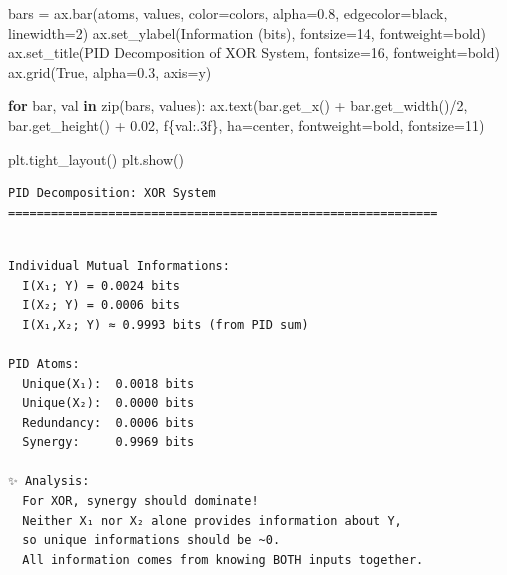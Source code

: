 \documentclass[
  11pt,
  letterpaper,
  oneside,
  openany]{book}
\newenvironment{Shaded}{\begin{snugshade}}{\end{snugshade}}
\newcommand{\BuiltInTok}[1]{\textcolor[rgb]{0.00,0.23,0.31}{#1}}
\newcommand{\ControlFlowTok}[1]{\textcolor[rgb]{0.00,0.23,0.31}{\textbf{#1}}}
\newcommand{\DecValTok}[1]{\textcolor[rgb]{0.68,0.00,0.00}{#1}}
\newcommand{\FloatTok}[1]{\textcolor[rgb]{0.68,0.00,0.00}{#1}}
\newcommand{\KeywordTok}[1]{\textcolor[rgb]{0.00,0.23,0.31}{\textbf{#1}}}
\newcommand{\NormalTok}[1]{\textcolor[rgb]{0.00,0.23,0.31}{#1}}
\newcommand{\OperatorTok}[1]{\textcolor[rgb]{0.37,0.37,0.37}{#1}}
\newcommand{\SpecialCharTok}[1]{\textcolor[rgb]{0.37,0.37,0.37}{#1}}
\newcommand{\SpecialStringTok}[1]{\textcolor[rgb]{0.13,0.47,0.30}{#1}}
\newcommand{\StringTok}[1]{\textcolor[rgb]{0.13,0.47,0.30}{#1}}
\newcommand{\VariableTok}[1]{\textcolor[rgb]{0.07,0.07,0.07}{#1}}
\begin{document}
\begin{Shaded}
\begin{Highlighting}[]
\NormalTok{bars }\OperatorTok{=}\NormalTok{ ax.bar(atoms, values, color}\OperatorTok{=}\NormalTok{colors, alpha}\OperatorTok{=}\FloatTok{0.8}\NormalTok{, edgecolor}\OperatorTok{=}\StringTok{\textquotesingle{}black\textquotesingle{}}\NormalTok{, linewidth}\OperatorTok{=}\DecValTok{2}\NormalTok{)}
\NormalTok{ax.set\_ylabel(}\StringTok{\textquotesingle{}Information (bits)\textquotesingle{}}\NormalTok{, fontsize}\OperatorTok{=}\DecValTok{14}\NormalTok{, fontweight}\OperatorTok{=}\StringTok{\textquotesingle{}bold\textquotesingle{}}\NormalTok{)}
\NormalTok{ax.set\_title(}\StringTok{\textquotesingle{}PID Decomposition of XOR System\textquotesingle{}}\NormalTok{, fontsize}\OperatorTok{=}\DecValTok{16}\NormalTok{, fontweight}\OperatorTok{=}\StringTok{\textquotesingle{}bold\textquotesingle{}}\NormalTok{)}
\NormalTok{ax.grid(}\VariableTok{True}\NormalTok{, alpha}\OperatorTok{=}\FloatTok{0.3}\NormalTok{, axis}\OperatorTok{=}\StringTok{\textquotesingle{}y\textquotesingle{}}\NormalTok{)}

\ControlFlowTok{for}\NormalTok{ bar, val }\KeywordTok{in} \BuiltInTok{zip}\NormalTok{(bars, values):}
\NormalTok{    ax.text(bar.get\_x() }\OperatorTok{+}\NormalTok{ bar.get\_width()}\OperatorTok{/}\DecValTok{2}\NormalTok{, bar.get\_height() }\OperatorTok{+} \FloatTok{0.02}\NormalTok{, }
            \SpecialStringTok{f\textquotesingle{}}\SpecialCharTok{\{}\NormalTok{val}\SpecialCharTok{:.3f\}}\SpecialStringTok{\textquotesingle{}}\NormalTok{, ha}\OperatorTok{=}\StringTok{\textquotesingle{}center\textquotesingle{}}\NormalTok{, fontweight}\OperatorTok{=}\StringTok{\textquotesingle{}bold\textquotesingle{}}\NormalTok{, fontsize}\OperatorTok{=}\DecValTok{11}\NormalTok{)}

\NormalTok{plt.tight\_layout()}
\NormalTok{plt.show()}
\end{Highlighting}
\end{Shaded}

\begin{verbatim}
PID Decomposition: XOR System
============================================================
\end{verbatim}

\begin{verbatim}

Individual Mutual Informations:
  I(X₁; Y) = 0.0024 bits
  I(X₂; Y) = 0.0006 bits
  I(X₁,X₂; Y) ≈ 0.9993 bits (from PID sum)

PID Atoms:
  Unique(X₁):  0.0018 bits
  Unique(X₂):  0.0000 bits
  Redundancy:  0.0006 bits
  Synergy:     0.9969 bits

✨ Analysis:
  For XOR, synergy should dominate!
  Neither X₁ nor X₂ alone provides information about Y,
  so unique informations should be ~0.
  All information comes from knowing BOTH inputs together.
\end{verbatim}
\end{document}
